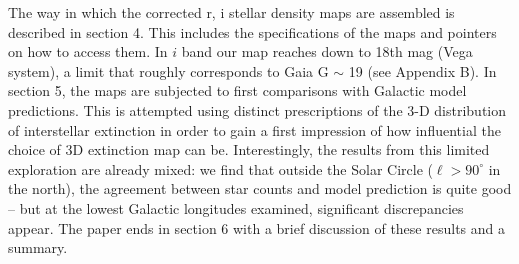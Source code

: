 \documentclass[a4paper,useAMS,usenatbib]{mn2e}
\begin{document}
The way in which the corrected r, i stellar density maps are assembled is described in 
section 4.  This includes the specifications of the maps and pointers on how to access 
them.  In $i$ band our map reaches down to 18th mag (Vega system), a limit that roughly
corresponds to Gaia G $\sim$ 19 (see Appendix B).   In section 5, the maps are subjected 
to first comparisons with Galactic model predictions.  This is attempted using distinct 
prescriptions of the 3-D distribution of interstellar extinction in order to gain a 
first impression of how influential the choice of 3D extinction map can be.  Interestingly, the 
results from this limited exploration are already mixed: we find that outside the 
Solar Circle ($\ell > 90^{\circ}$  in the north), the agreement between star counts and 
model prediction is quite good -- but at the lowest Galactic longitudes examined, 
significant discrepancies appear.  The paper ends in section 6 with a brief discussion of 
these results and a summary.
\end{document}
